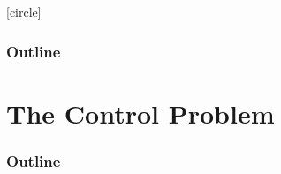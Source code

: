 \documentclass[10pt, aspectratio=169]{beamer}
\theoremstyle{remark}
\theoremstyle{definition}
\begin{document}
[circle]

\begin{frame}
	\frametitle{Outline} %
	\tableofcontents %
\end{frame}

\section{The Control Problem}

\begin{frame}
	\frametitle{Outline} %
	\tableofcontents[currentsection] %
\end{frame}
\end{document}
